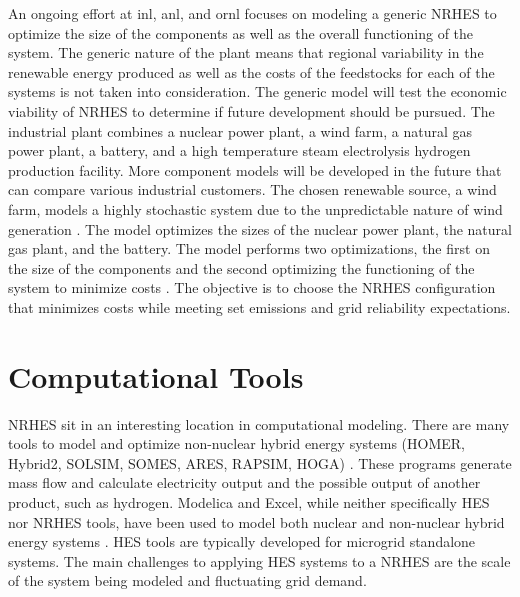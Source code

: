 \documentclass[12pt]{UIdahoMastersThesis}
\begin{document}
An ongoing effort at \ac{inl}, \ac{anl}, and \ac{ornl} focuses on modeling a generic NRHES to optimize the size of the components as well as the overall functioning of the system. The generic nature of the plant means that regional variability in the renewable energy produced as well as the costs of the feedstocks for each of the systems is not taken into consideration. The generic model will test the economic viability of NRHES to determine if future development should be pursued. The industrial plant combines a nuclear power plant, a wind farm, a natural gas power plant, a battery, and a high temperature steam electrolysis hydrogen production facility. More component models will be developed in the future that can compare various industrial customers\cite{Harrison2016}. The chosen renewable source, a wind farm, models a highly stochastic system due to the unpredictable nature of wind generation \cite{Chen2016_wind}. The model optimizes the sizes of the nuclear power plant, the natural gas plant, and the battery. The model performs two optimizations, the first on the size of the components and the second optimizing the functioning of the system to minimize costs \cite{redfoot_rabiti_2018}. The objective is to choose the NRHES configuration that minimizes costs while meeting set emissions and grid reliability expectations.
\section{Computational Tools}
NRHES sit in an interesting location in computational modeling. There are many tools to model and optimize non-nuclear hybrid energy systems (HOMER, Hybrid2, SOLSIM, SOMES, ARES, RAPSIM, HOGA) \cite {Bernal-Agustin2009}. These programs generate mass flow and calculate electricity output and the possible output of another product, such as hydrogen. Modelica and Excel, while neither specifically HES nor NRHES tools, have been used to model both nuclear and non-nuclear hybrid energy systems \cite{Shropshire2012, Chen2016, Binder2014, Garcia2015, Epiney2016}. HES tools are typically developed for microgrid standalone systems. The main challenges to applying HES systems to a NRHES are the scale of the system being modeled and fluctuating grid demand.
\end{document}
